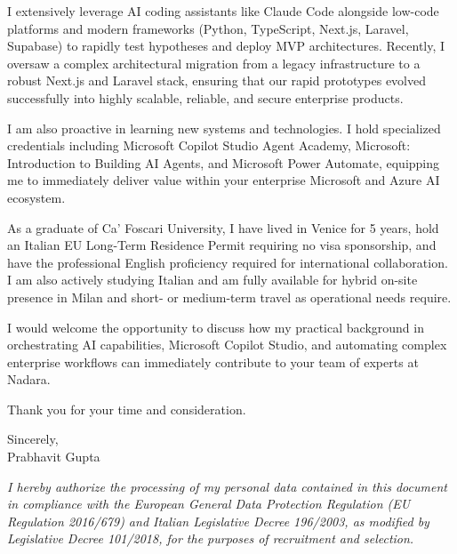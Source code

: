 \documentclass[a4paper,10pt]{article}
\begin{document}
I extensively leverage AI coding assistants like Claude Code alongside low-code platforms and modern frameworks (Python, TypeScript, Next.js, Laravel, Supabase) to rapidly test hypotheses and deploy MVP architectures. Recently, I oversaw a complex architectural migration from a legacy infrastructure to a robust Next.js and Laravel stack, ensuring that our rapid prototypes evolved successfully into highly scalable, reliable, and secure enterprise products.

I am also proactive in learning new systems and technologies. I hold specialized credentials including Microsoft Copilot Studio Agent Academy, Microsoft: Introduction to Building AI Agents, and Microsoft Power Automate, equipping me to immediately deliver value within your enterprise Microsoft and Azure AI ecosystem.

As a graduate of Ca' Foscari University, I have lived in Venice for 5 years, hold an Italian EU Long-Term Residence Permit requiring no visa sponsorship, and have the professional English proficiency required for international collaboration. I am also actively studying Italian and am fully available for hybrid on-site presence in Milan and short- or medium-term travel as operational needs require.

I would welcome the opportunity to discuss how my practical background in orchestrating AI capabilities, Microsoft Copilot Studio, and automating complex enterprise workflows can immediately contribute to your team of experts at Nadara.

Thank you for your time and consideration.

Sincerely,\\[2pt]
Prabhavit Gupta

\vspace{4pt}
\textit{\footnotesize I hereby authorize the processing of my personal data contained in this document in compliance with the European General Data Protection Regulation (EU Regulation 2016/679) and Italian Legislative Decree 196/2003, as modified by Legislative Decree 101/2018, for the purposes of recruitment and selection.}
\end{document}
